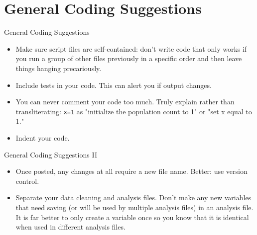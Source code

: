 \documentclass{beamer}
\begin{document}
\section{General Coding Suggestions}
\begin{frame}{General Coding Suggestions}

\begin{itemize} 
\item Make sure script files are self-contained: don't write code that only works if you run a group of other files previously in a specific order and then leave things hanging precariously. 

\item Include tests in your code.   
This can alert you if output changes. 

\item You can never comment your code too much. Truly explain rather than transliterating: \texttt{x=1} as "initialize the population count to 1" or "set x equal to 1."
 
\item Indent your code.   
\end{itemize}
\end{frame}

\begin{frame}{General Coding Suggestions II}
\begin{itemize}
\item  Once posted, any changes at all require a new file name. Better: use version control.  

\item  Separate your data cleaning and analysis files. Don't make any new variables that need saving (or will be used by multiple analysis files) in an analysis file. It is far better to only create a variable once so you know that it is identical when used in different analysis files.
\end{itemize}
\end{frame}
\end{document}
